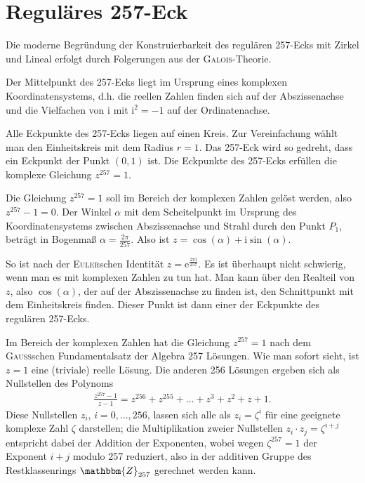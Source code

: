\documentclass[11pt]{article}
\newcommand{\ii}{\mathrm{i}}
\newcommand{\Z}{\mathbbm{Z}}
\begin{document}
\section{Reguläres 257-Eck}

Die moderne Begründung der Konstruierbarkeit des regulären 257-Ecks mit Zirkel
und Lineal erfolgt durch Folgerungen aus der \textsc{Galois}-Theorie.

Der Mittelpunkt des 257-Ecks liegt im Ursprung eines komplexen
Koordinatensystems, d.h. die reellen Zahlen finden sich auf der Abszissenachse
und die Vielfachen von $\ii$ mit $\ii^{2}=-1$ auf der Ordinatenachse.

Alle Eckpunkte des 257-Ecks liegen auf einen Kreis. Zur Vereinfachung wählt
man den Einheitskreis mit dem Radius $r = 1$. Das 257-Eck wird so gedreht,
dass ein Eckpunkt der Punkt $(0,1)$ ist. Die Eckpunkte des 257-Ecks erfüllen
die komplexe Gleichung $z^{257} = 1$.

Die Gleichung $z^{257} =1$ soll im Bereich der komplexen Zahlen gelöst werden,
also $z^{257} - 1 = 0$. Der Winkel $\alpha$ mit dem Scheitelpunkt im Ursprung
des Koordinatensystems zwischen Abszissenachse und Strahl durch den Punkt
$P_1$, beträgt in Bogenmaß $\alpha= \frac{2\pi}{257}$. Also ist $z =
\cos(\alpha) + \ii\sin(\alpha)$.

So ist nach der \textsc{Euler}schen Identität $z =
\mathrm{e}^{\frac{2\pi\ii}{257}}$.  Es ist überhaupt nicht schwierig, wenn man
es mit komplexen Zahlen zu tun hat. Man kann über den Realteil von $z$, also
$\cos(\alpha)$, der auf der Abszissenachse zu finden ist, den Schnittpunkt mit
dem Einheitskreis finden. Dieser Punkt ist dann einer der Eckpunkte des
regulären 257-Ecks.

Im Bereich der komplexen Zahlen hat die Gleichung $z^{257} = 1$ nach dem
\textsc{Gauss}schen Fundamentalsatz der Algebra 257 Lösungen. Wie man sofort
sieht, ist $z = 1$ eine (triviale) reelle Lösung. Die anderen 256 Lösungen
ergeben sich als Nullstellen des Polynoms
\begin{gather*}
   \frac{z^{257}-1}{z-1}=z^{256}+z^{255}+\ldots+z^3+z^2+z+1.\tag{2}
\end{gather*}
Diese Nullstellen $z_i$, $i=0,\ldots,256$, lassen sich alle als $z_i=\zeta^i$
für eine geeignete komplexe Zahl $\zeta$ darstellen; die Multiplikation zweier
Nullstellen $z_i\cdot z_j=\zeta^{i+j}$ entspricht dabei der Addition der
Exponenten, wobei wegen $\zeta^{257}=1$ der Exponent $i+j$ modulo 257
reduziert, also in der additiven Gruppe des Restklassenrings $\Z_{257}$
gerechnet werden kann.
\end{document}
